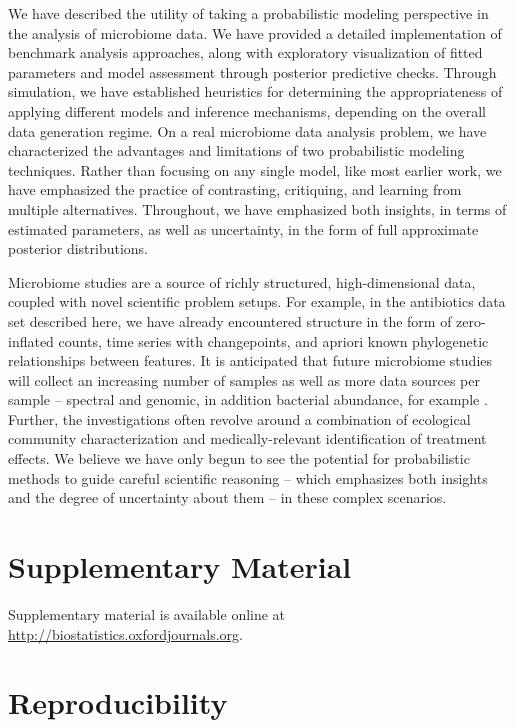 \documentclass[oupdraft]{bio}
\begin{document}
{We have described the utility of taking a probabilistic modeling perspective in
the analysis of microbiome data. We have provided a detailed implementation of
benchmark analysis approaches, along with exploratory visualization of fitted
parameters and model assessment through posterior predictive checks. Through
simulation, we have established heuristics for determining the appropriateness
of applying different models and inference mechanisms, depending on the overall
data generation regime. On a real microbiome data analysis problem, we have
characterized the advantages and limitations of two probabilistic modeling
techniques. Rather than focusing on any single model, like most earlier work, we
have emphasized the practice of contrasting, critiquing, and learning from
multiple alternatives. Throughout, we have emphasized both insights, in terms of
estimated parameters, as well as uncertainty, in the form of full approximate
posterior distributions.

Microbiome studies are a source of richly structured, high-dimensional data,
coupled with novel scientific problem setups. For example, in the antibiotics
data set described here, we have already encountered structure in the form of
zero-inflated counts, time series with changepoints, and apriori known
phylogenetic relationships between features. It is anticipated that future
microbiome studies will collect an increasing number of samples as well as more
data sources per sample -- spectral and genomic, in addition bacterial
abundance, for example \citep{jansson2016multi}. Further, the investigations
often revolve around a combination of ecological community characterization and
medically-relevant identification of treatment effects. We believe we have only
begun to see the potential for probabilistic methods to guide careful scientific
reasoning -- which emphasizes both insights and the degree of uncertainty about
them -- in these complex scenarios.

\section{Supplementary Material}

Supplementary material is available online at
\url{http://biostatistics.oxfordjournals.org}.

\section{Reproducibility}

}
\end{document}
